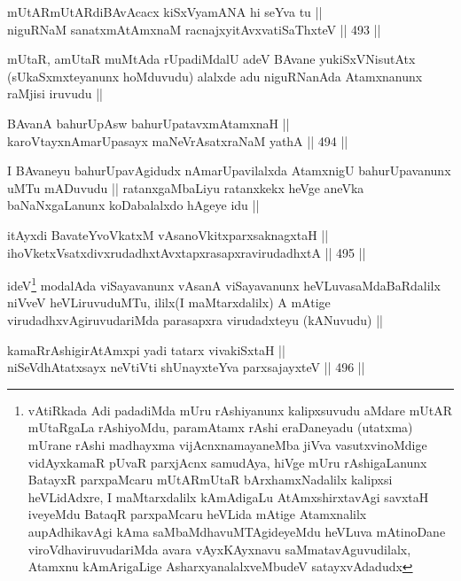 \begin{shl}
mUtARmUtARdiBAvAcacx kiSxVyamANA hi seYva tu || \\
niguRNaM sanatxmAtAmxnaM racnajxyitAvx\s vatiSaThxteV ||  493 ||  
\end{shl}

\begin{artha}
mUtaR, amUtaR muMtAda rUpadiMdalU adeV BAvane yukiSxVNisutAtx
(sUkaSxmxteyanunx hoMduvudu) alalxde adu niguRNanAda Atamxnanunx
raMjisi iruvudu ||
\end{artha}

\begin{shl}
BAvanA bahurUpA\s sw bahurUpatavxmAtamxnaH || \\
karoVtayxnAmarUpasayx maNeVrAsatxraNaM yathA ||  494 ||  
\end{shl}

\begin{artha}
I BAvaneyu bahurUpavAgidudx nAmarUpavilalxda AtamxnigU bahurUpavanunx
uMTu mADuvudu || ratanxgaMbaLiyu ratanxkekx heVge aneVka
baNaNxgaLanunx koDabalalxdo hAgeye idu ||
\end{artha}


\begin{shl}
itAyxdi BavateYvoVkatxM vAsanoVkitxparxsaknagxtaH ||  \\
ihoVketxVsatxdivxrudadhxtAvxtapxrasapxravirudadhxtA ||  495 ||  
\end{shl}

\begin{artha}
ideV\footnote{vAtiRkada Adi padadiMda mUru rAshiyanunx kalipxsuvudu
  aMdare mUtAR mUtaRgaLa rAshiyoMdu, paramAtamx rAshi eraDaneyadu
  (utatxma) mUrane rAshi madhayxma vijAcnxnamayaneMba jiVva
  vasutxvinoMdige vidAyxkamaR pUvaR parxjAcnx samudAya, hiVge mUru
  rAshigaLanunx BatayxR parxpaMcaru mUtARmUtaR bArxhamxNadalilx
  kalipxsi heVLidAdxre, I maMtarxdalilx kAmAdigaLu AtAmxshirxtavAgi
  savxtaH iveyeMdu BataqR parxpaMcaru heVLida mAtige Atamxnalilx
  aupAdhikavAgi kAma saMbaMdhavuMTAgideyeMdu heVLuva mAtinoDane
  viroVdhaviruvudariMda avara vAyxKAyxnavu saMmatavAguvudilalx,
  Atamxnu kAmArigaLige AsharxyanalalxveMbudeV satayxvAdadudx} modalAda viSayavanunx vAsanA viSayavanunx
heVLuvasaMdaBaRdalilx niVveV heVLiruvuduMTu, ililx\footnotemark (I
maMtarxdalilx) A mAtige virudadhxvAgiruvudariMda parasapxra
virudadxteyu (kANuvudu) ||
\end{artha}

\begin{shl}
kamaRrAshigirA\s \s tAmx\s pi yadi tatarx vivakiSxtaH || \\
niSeVdhAtatxsayx neVtiVti shUnayxteYva parxsajayxteV ||  496 ||  
\end{shl}

